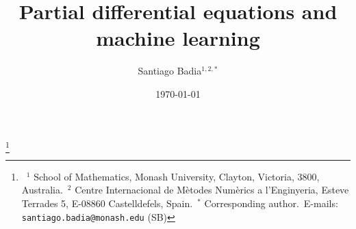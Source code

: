 \documentclass[oneside,reqno,12pt,a4paper]{amsart}
\begin{document}
\title[PDEs and ML]{Partial differential equations and machine learning}
\author[S. Badia]{Santiago Badia$^{1,2,*}$}
\thanks{\null\
$^{1}$ School of Mathematics, Monash University, Clayton, Victoria, 3800, Australia.\
$^{2}$ Centre Internacional de M\`etodes Num\`erics a l'Enginyeria, Esteve Terrades 5, E-08860 Castelldefels, Spain.\
$^*$ Corresponding author.\
E-mails: {\tt santiago.badia@monash.edu} (SB) 
}
\date{\today}
\maketitle


%

\printbibliography
\end{document}
